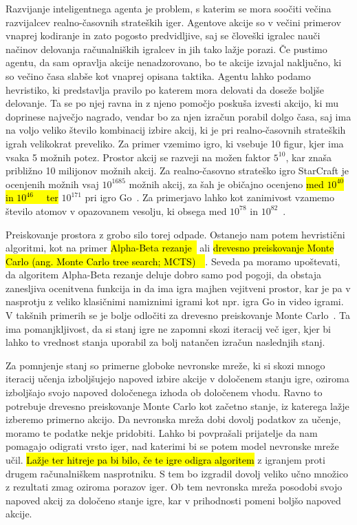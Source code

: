 \documentclass[a4paper, 12pt]{book}
\begin{document}
Razvijanje inteligentnega agenta je problem, s katerim se mora soočiti večina razvijalcev realno-časovnih strateških iger. 
Agentove akcije so v večini primerov vnaprej kodiranje in zato pogosto predvidljive, saj se človeški igralec nauči načinov delovanja računalniških igralcev in jih tako lažje porazi.
Če pustimo agentu, da sam opravlja akcije nenadzorovano, bo te akcije izvajal naključno, ki so večino časa slabše kot vnaprej opisana taktika.
Agentu lahko podamo hevristiko, ki predstavlja pravilo po katerem mora delovati da doseže boljše delovanje.
Ta se po njej ravna in z njeno pomočjo poskuša izvesti akcijo, ki mu doprinese največjo nagrado, vendar bo za njen izračun porabil dolgo časa, saj ima na voljo veliko število kombinacij izbire akcij, ki je pri realno-časovnih strateških igrah velikokrat preveliko.
Za primer vzemimo igro, ki vsebuje 10 figur, kjer ima vsaka 5 možnih potez.
Prostor akcij se razveji na možen faktor $5^{10}$, kar znaša približno 10 milijonov možnih akcij.
Za realno-časovno strateško igro StarCraft je ocenjenih možnih vsaj $10^{1685}$ možnih akcij, za šah je običajno ocenjeno \hl{med $10^{40}$ in $10^{46}$~{\cite{chinchalkar1996upper}}~{\cite{steinerberger2015number}} ter} $10^{171}$ pri igro Go~\cite{ontanon2017combinatorial}.
Za primerjavo lahko kot zanimivost vzamemo število atomov v opazovanem vesolju, ki obsega med $10^{78}$ in $10^{82}$~\cite{atoms}.

Preiskovanje prostora z grobo silo torej odpade. 
Ostanejo nam potem hevristični algoritmi, kot na primer \hl{Alpha-Beta rezanje~{\cite{knuth1975analysis}}} ali \hl{drevesno preiskovanje Monte Carlo (ang. Monte Carlo tree search; MCTS)~{\cite{kocsis2006bandit}}~{\cite{coulom2006efficient}}}. 
Seveda pa moramo upoštevati, da algoritem Alpha-Beta rezanje deluje dobro samo pod pogoji, da obstaja zanesljiva ocenitvena funkcija in da ima igra majhen vejitveni prostor, kar je pa v nasprotju z veliko klasičnimi namiznimi igrami kot npr. igra Go in video igrami. 
V takšnih primerih se je bolje odločiti za drevesno preiskovanje Monte Carlo~\cite{chaslot2008monte}.
Ta ima pomanjkljivost, da si stanj igre ne zapomni skozi iteracij več iger, kjer bi lahko to vrednost stanja uporabil za bolj natančen izračun naslednjih stanj.

Za pomnjenje stanj so primerne globoke nevronske mreže, ki si skozi mnogo iteracij učenja izboljšujejo napoved izbire akcije v določenem stanju igre, oziroma izboljšajo svojo napoved določenega izhoda ob določenem vhodu.
Ravno to potrebuje drevesno preiskovanje Monte Carlo kot začetno stanje, iz katerega lažje izberemo primerno akcijo.
Da nevronska mreža dobi dovolj podatkov za učenje, moramo te podatke nekje pridobiti.
Lahko bi povprašali prijatelje da nam pomagajo odigrati vrsto iger, nad katerimi bi se potem model nevronske mreže učil.
\hl{Lažje ter hitreje pa bi bilo, če te igre odigra algoritem} z igranjem proti drugem računalniškem nasprotniku.
S tem bo izgradil dovolj veliko učno množico z rezultati zmag oziroma porazov iger. 
Ob tem nevronska mreža posodobi svojo napoved akcij za določeno stanje igre, kar v prihodnosti pomeni boljšo napoved akcije.
\end{document}
